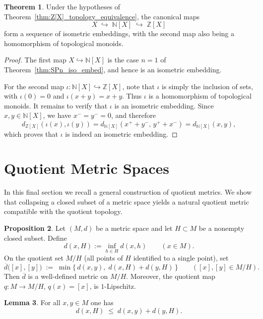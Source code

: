 \documentclass[10pt,a4paper]{article}
\theoremstyle{definition}
\newtheorem{theorem}{Theorem}[section]
\newtheorem{proposition}[theorem]{Proposition}
\newtheorem{lemma}[theorem]{Lemma}
\newcommand{\Z}{\mathbb{Z}}
\newcommand{\N}{\mathbb{N}}
\begin{document}
\begin{theorem}\label{thm:top_monoid_seq}
Under the hypotheses of Theorem~\ref{thm:Z[X]_topology_equivalence},
the canonical maps
\[
X \;\hookrightarrow\; \N[X] \;\hookrightarrow\; \Z[X]
\]
form a sequence of isometric embeddings, with the second map also being a
homomorphism of topological monoids.
\end{theorem}
\begin{proof}
The first map $X \hookrightarrow \N[X]$ is the case $n=1$ of
Theorem~\ref{thm:SPn_iso_embed}, and hence is an isometric embedding.

For the second map $\iota \colon \N[X] \hookrightarrow \Z[X]$, note that $\iota$
is simply the inclusion of sets, with $\iota(0)=0$ and
$\iota(x+y)=x+y$. Thus $\iota$ is a homomorphism of topological monoids. It
remains to verify that $\iota$ is an isometric embedding. Since
$x,y \in \N[X]$, we have $x^{-}=y^{-}=0$, and therefore
\[
d_{\Z[X]}(\iota(x),\iota(y))
  = d_{\N[X]}(x^{+}+y^{-},\, y^{+}+x^{-})
  = d_{\N[X]}(x,y),
\]
which proves that $\iota$ is indeed an isometric embedding.
\end{proof}






\section{Quotient Metric Spaces}

In this final section we recall a general construction of quotient metrics. We show that collapsing a closed subset of a
metric space yields a natural quotient metric compatible with the quotient
topology.

\begin{proposition}\label{prop:quotient-metric}
Let $(M,d)$ be a metric space and let $H\subset M$ be a nonempty closed subset.  
Define
\[
d(x,H):=\inf_{h\in H} d(x,h)\qquad (x\in M).
\]
On the quotient set $M/H$ (all points of $H$ identified to a single point), set
\[
\overline d\big([x],[y]\big)\;:=\;\min\bigl\{\,d(x,y),\; d(x,H)+d(y,H)\,\bigr\}\qquad([x],[y]\in M/H).
\]
Then $\overline d$ is a well-defined metric on $M/H$. Moreover, the quotient map
$q:M\to M/H$, $q(x)=[x]$, is $1$-Lipschitz.
\end{proposition}

\begin{lemma}\label{lem:distance-to-H}
For all $x,y\in M$ one has
\[
d(x,H)\;\le\; d(x,y) + d(y,H).
\]
\end{lemma}
\end{document}
